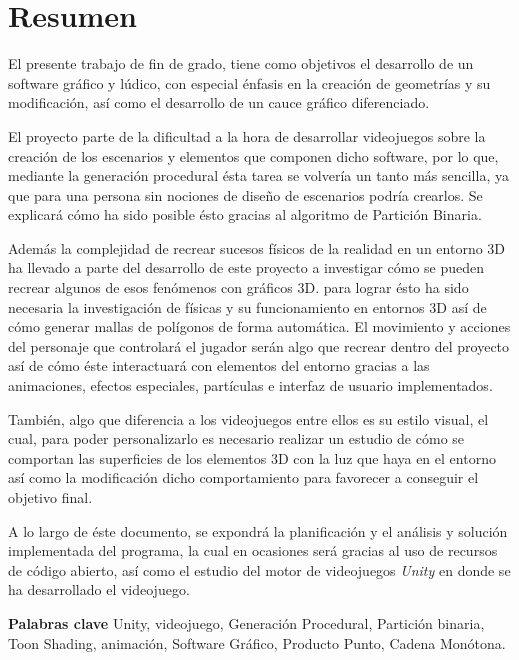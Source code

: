 \chapter{Resumen}
    El presente trabajo de fin de grado, tiene como objetivos el desarrollo de un software gráfico y lúdico, con especial énfasis en la creación de geometrías y su modificación, así como el desarrollo de un cauce gráfico diferenciado.

    El proyecto parte de la dificultad a la hora de desarrollar videojuegos sobre la creación de los escenarios y elementos que componen dicho software, por lo que, mediante la generación procedural ésta tarea se volvería un tanto más sencilla, ya que para una persona sin nociones de diseño de escenarios podría crearlos. Se explicará cómo ha sido posible ésto gracias al algoritmo de Partición Binaria.
    
    Además la complejidad de recrear sucesos físicos de la realidad en un entorno 3D ha llevado a parte del desarrollo de este proyecto a investigar cómo se pueden recrear algunos de esos fenómenos con gráficos 3D. para lograr ésto ha sido necesaria la investigación de físicas y su funcionamiento en entornos 3D así de cómo generar mallas de polígonos de forma automática.  El movimiento y acciones del personaje que controlará el jugador serán algo que recrear dentro del proyecto así de cómo éste interactuará con elementos del entorno gracias a las animaciones, efectos especiales, partículas e interfaz de usuario implementados.

    También, algo que diferencia a los videojuegos entre ellos es su estilo visual, el cual, para poder personalizarlo es necesario realizar un estudio de cómo se comportan las superficies de los elementos 3D con la luz que haya en el entorno así como la modificación dicho comportamiento para favorecer a conseguir el objetivo final.

    A lo largo de éste documento, se expondrá la planificación y el análisis y solución implementada del programa, la cual en ocasiones será gracias al uso de recursos de código abierto, así como el estudio del motor de videojuegos \textit{Unity} en donde se ha desarrollado el videojuego.

    \textbf{Palabras clave} Unity, videojuego, Generación Procedural, Partición binaria, Toon Shading, animación, Software Gráfico, Producto Punto, Cadena Monótona.
    